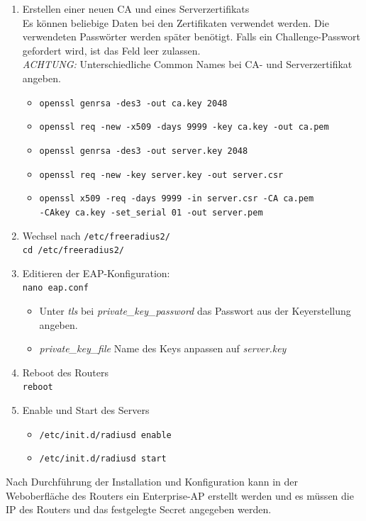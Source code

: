 \begin{enumerate}
	\item {Erstellen einer neuen CA und eines Serverzertifikats}\\
	Es können beliebige Daten bei den Zertifikaten verwendet werden. Die verwendeten Passwörter werden später benötigt. Falls ein Challenge-Passwort gefordert wird, ist das Feld leer zulassen. \\
	\textit{ACHTUNG:} Unterschiedliche Common Names bei CA- und Serverzertifikat angeben.
	\begin{itemize}
		\item \colorbox{altgray}{\lstinline|openssl genrsa -des3 -out ca.key 2048|}
		\item \colorbox{altgray}{\lstinline|openssl req -new -x509 -days 9999 -key ca.key -out ca.pem|}
		\item \colorbox{altgray}{\lstinline|openssl genrsa -des3 -out server.key 2048|}
		\item \colorbox{altgray}{\lstinline|openssl req -new -key server.key -out server.csr|}
		\item \colorbox{altgray}{\lstinline|openssl x509 -req -days 9999 -in server.csr -CA ca.pem|} \\  	 \colorbox{altgray}{\lstinline|-CAkey ca.key -set_serial 01 -out server.pem|}
	\end{itemize}


	\item {Wechsel nach \colorbox{altgray}{\lstinline|/etc/freeradius2/|} }\\
	\colorbox{altgray}{\lstinline|cd /etc/freeradius2/|}
	\item {Editieren der EAP-Konfiguration: \\
	\colorbox{altgray}{\lstinline|nano eap.conf|}}
	\begin{itemize}
		\item Unter \textit{tls} bei \textit{private\_key\_password} das Passwort aus der Keyerstellung angeben.
		\item \textit{private\_key\_file} Name des Keys anpassen auf \textit{server.key}
	\end{itemize}

	\item {Reboot des Routers} \\
	\colorbox{altgray}{\lstinline|reboot|}
	\item {Enable und Start des Servers}
	\begin{itemize}
		\item \colorbox{altgray}{\lstinline|/etc/init.d/radiusd enable|}
		\item \colorbox{altgray}{\lstinline|/etc/init.d/radiusd start|}
	\end{itemize}

\end{enumerate}
Nach Durchführung der Installation und Konfiguration kann in der Weboberfläche des Routers ein Enterprise-AP erstellt werden und es müssen die IP des Routers und das festgelegte Secret angegeben werden.

